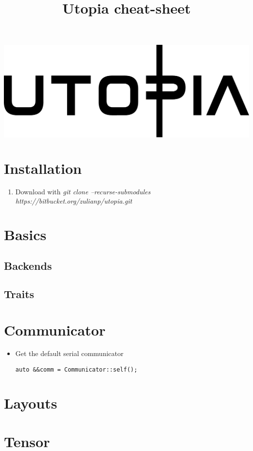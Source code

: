 \documentclass[a4paper,landscape,columns=3]{cheatsheet} %
\title{Utopia cheat-sheet}
\begin{document}
\href{https://bitbucket.org/zulianp/utopia}{\includegraphics[width=0.5\linewidth]{../../utopia_logo.pdf}}
\section{Installation}
\begin{enumerate}\footnotesize
\item Download with \emph{git clone --recurse-submodules https://bitbucket.org/zulianp/utopia.git}
\end{enumerate}


\section{Basics}
\subsection{Backends}

\subsection{Traits}

\section{Communicator}
\begin{itemize}
	\item
Get the default serial communicator
\begin{lstlisting}
auto &&comm = Communicator::self();
\end{lstlisting}
\end{itemize}

\section{Layouts}

\section{Tensor}
\end{document}
